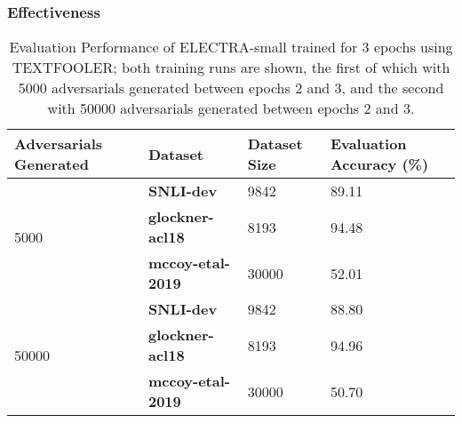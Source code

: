 \documentclass[11pt,a4paper]{article}
\begin{document}
\newpage
\subsubsection{Effectiveness}

\begin{table}[hbt!]
\begin{center}
\tiny
\begin{tabular}{p{} p{} | p{} p{}}
  \textbf{Adversarials Generated} & \textbf{Dataset} & \textbf{Dataset Size} & \textbf{Evaluation Accuracy} (\%)\\
  \hline
  \multirow{3}{*}{5000} & \textbf{SNLI-dev} & 9842 & 89.11 \\
  & \textbf{glockner-acl18} & 8193 & 94.48 \\
  & \textbf{mccoy-etal-2019} & 30000 & 52.01 \\
  
  \hline
  
  \multirow{3}{*}{50000} & \textbf{SNLI-dev} & 9842 & 88.80 \\
  & \textbf{glockner-acl18} & 8193 & 94.96 \\
  & \textbf{mccoy-etal-2019} & 30000 & 50.70 \\
\end{tabular}
\end{center}
\caption{Evaluation Performance of ELECTRA-small trained for 3 epochs using TEXTFOOLER; both training runs are shown, the first of which with 5000 adversarials generated between epochs 2 and 3, and the second with 50000 adversarials generated between epochs 2 and 3.}
\end{table}
\end{document}
